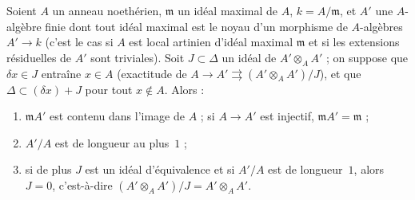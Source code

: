 \begin{encadre}
\begin{theoreme}\label{thm:128-local}
Soient $A$ un anneau noethérien, $\mathfrak m$ un idéal maximal de $A$, $k = A/\mathfrak m$, et $A'$ une $A$-algèbre finie dont tout idéal maximal est le noyau d'un morphisme de $A$-algèbres $A' \to k$ (c'est le cas si $A$ est local artinien d'idéal maximal $\mathfrak m$ et si les extensions résiduelles de $A'$ sont triviales). Soit $J \subset \Delta$ un idéal de $A' \otimes_A A'$ ; on suppose que $\delta x \in J$ entraîne $x \in A$ (exactitude de $A \to A' \rightrightarrows (A' \otimes_A A')/J$), et que $\Delta \subset (\delta x) + J$ pour tout $x \notin A$. Alors :
\begin{enumerate}
\item $\mathfrak m A'$ est contenu dans l'image de $A$ ; si $A \to A'$ est injectif, $\mathfrak m A' = \mathfrak m$ ;
\item $A'/A$ est de longueur au plus~$1$ ;
\item si de plus $J$ est un idéal d'équivalence et si $A'/A$ est de longueur~$1$, alors $J = 0$, c'est-à-dire $(A' \otimes_A A')/J = A' \otimes_A A'$.
\end{enumerate}
\end{theoreme}
\end{encadre}

